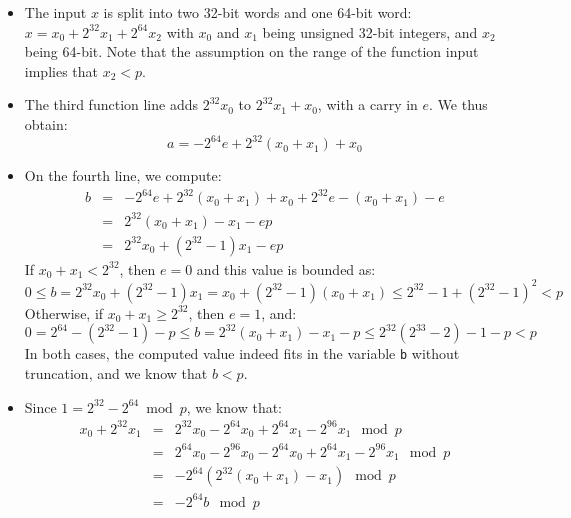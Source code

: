 \documentclass{llncs}
\begin{document}
\begin{itemize}

    \item The input $x$ is split into two 32-bit words and one 64-bit
    word: $x = x_0 + 2^{32} x_1 + 2^{64} x_2$ with $x_0$ and $x_1$
    being unsigned 32-bit integers, and $x_2$ being 64-bit. Note that
    the assumption on the range of the function input implies that
    $x_2 < p$.

    \item The third function line adds $2^{32} x_0$ to
    $2^{32} x_1 + x_0$, with a carry in $e$. We thus obtain:
    \begin{equation*}
        a = -2^{64}e + 2^{32} (x_0 + x_1) + x_0
    \end{equation*}

    \item On the fourth line, we compute:
    \begin{eqnarray*}
        b &=& -2^{64}e + 2^{32} (x_0 + x_1) + x_0 + 2^{32}e - (x_0 + x_1) - e \\
          &=& 2^{32} (x_0 + x_1) - x_1 - ep \\
          &=& 2^{32} x_0 + (2^{32} - 1) x_1 - ep
    \end{eqnarray*}
    If $x_0 + x_1 < 2^{32}$, then $e = 0$ and this value is bounded as:
    \begin{equation*}
        0 \leq b = 2^{32} x_0 + (2^{32} - 1) x_1 = x_0 + (2^{32} - 1)(x_0 + x_1)
        \leq 2^{32} - 1 + (2^{32} - 1)^2 < p
    \end{equation*}
    Otherwise, if $x_0 + x_1 \geq 2^{32}$, then $e = 1$, and:
    \begin{equation*}
        0 = 2^{64} - (2^{32} - 1) - p \leq b = 2^{32}(x_0 + x_1) - x_1 - p
        \leq 2^{32}(2^{33} - 2) - 1 - p < p
    \end{equation*}
    In both cases, the computed value indeed fits in the variable \verb+b+
    without truncation, and we know that $b < p$.

    \item Since $1 = 2^{32} - 2^{64} \bmod p$, we know that:
    \begin{eqnarray*}
        x_0 + 2^{32} x_1 &=& 2^{32} x_0 - 2^{64} x_0
                             + 2^{64} x_1 - 2^{96} x_1 \mod p \\
                         &=& 2^{64} x_0 - 2^{96} x_0 - 2^{64} x_0
                             + 2^{64} x_1 - 2^{96} x_1 \mod p \\
                         &=& -2^{64} (2^{32} (x_0 + x_1) - x_1) \mod p \\
                         &=& -2^{64} b \mod p
    \end{eqnarray*}


\end{itemize}
\end{document}
